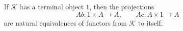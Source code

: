 If $\mathcal{K}$ has a terminal object $1$, then the projections
$$Ab: 1 \times A \to A, \qquad Ac: A \times 1 \to A$$
are natural equivalences of functors from $\mathcal{K}$ to itself.
